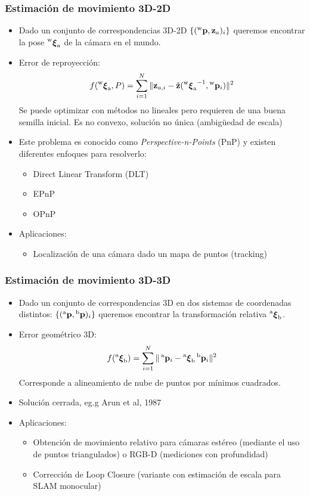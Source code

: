 \begin{frame}
	\frametitle{Estimación de movimiento 3D-2D}
	\footnotesize
	
	\begin{itemize}
		\item Dado un conjunto de correspondencias 3D-2D $\{(\prescript{\mathrm{\mathrm{w}}}{}{\boldsymbol{\mathbf{p}}}, \boldsymbol{\mathbf{z}}_{a})_{i}\}$ queremos encontrar la pose $\prescript{\mathrm{w}}{}{{\boldsymbol{\mathbf{\xi}}}_\mathrm{a}}$ de la cámara en el mundo.
		\item Error de reproyección:
		\[
		f(\prescript{\mathrm{\mathrm{w}}}{}{{\boldsymbol{\mathbf{\xi}}}_\mathrm{a}}, P)= \sum_{i=1}^{N} \Vert \boldsymbol{\mathbf{z}}_{a,i} - \hat{\boldsymbol{\mathbf{z}}}({\prescript{\mathrm{\mathrm{w}}}{}{{\boldsymbol{\mathbf{\xi}}}_\mathrm{a}}}^{-1},\prescript{\mathrm{\mathrm{w}}}{}{\boldsymbol{\mathbf{p}}}_{i}) \Vert^{2}
		\]
		Se puede optimizar con métodos no lineales pero requieren de una buena semilla inicial. Es no convexo, solución no única (ambigüedad de escala)
		\item Este problema es conocido como \emph{Perspective-n-Points} (PnP) y existen diferentes enfoques para resolverlo:
		\begin{itemize}
			\item Direct Linear Transform (DLT)
			\item EPnP
			\item OPnP
		\end{itemize}
		\item Aplicaciones:
		\begin{itemize}
			\item Localización de una cámara dado un mapa de puntos (tracking)
		\end{itemize}
	\end{itemize}
	
\end{frame}

\begin{frame}
	\frametitle{Estimación de movimiento 3D-3D}
	\footnotesize
	
	\begin{itemize}
		\item Dado un conjunto de correspondencias 3D en dos sistemas de coordenadas distintos: $\{(\prescript{\mathrm{a}}{}{\boldsymbol{\mathbf{p}}}, \prescript{\mathrm{b}}{}{\boldsymbol{\mathbf{p}}})_{i}\}$ queremos encontrar la transformación relativa $\prescript{\mathrm{a}}{}{{\boldsymbol{\mathbf{\xi}}}_\mathrm{b}}$.
		\item Error geométrico 3D:
		\[
		f(\prescript{\mathrm{a}}{}{{\boldsymbol{\mathbf{\xi}}}_\mathrm{b}})= \sum_{i=1}^{N} \Vert \prescript{\mathrm{a}}{}{\boldsymbol{\mathbf{p}}}_{i} - \prescript{\mathrm{a}}{}{{\boldsymbol{\mathbf{\xi}}}_\mathrm{b}} \prescript{\mathrm{b}}{}{\boldsymbol{\mathbf{p}}}_{i} \Vert^{2}
		\]
		Corresponde a alineamiento de nube de puntos por mínimos cuadrados.
		\item Solución cerrada, eg.g Arun et al, 1987
		\item Aplicaciones:
		\begin{itemize}
			\item Obtención de movimiento relativo para cámaras estéreo (mediante el uso de puntos triangulados) o RGB-D (mediciones con profundidad)
			\item Corrección de Loop Closure (variante con estimación de escala para SLAM monocular)
		\end{itemize}
	\end{itemize}
	
\end{frame}

